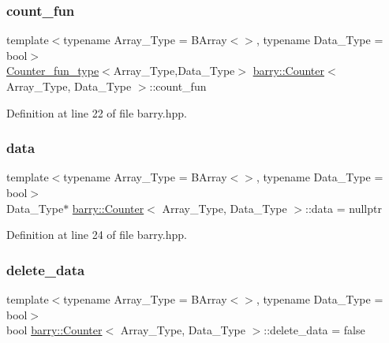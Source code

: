 \subsubsection{\texorpdfstring{count\+\_\+fun}{count\_fun}}
{\footnotesize\ttfamily template$<$typename Array\+\_\+\+Type  = B\+Array$<$$>$, typename Data\+\_\+\+Type  = bool$>$ \\
\hyperlink{namespacebarry_abaaae3200da8e4b7faac3c04fe9c3081}{Counter\+\_\+fun\+\_\+type}$<$Array\+\_\+\+Type,Data\+\_\+\+Type$>$ \hyperlink{classbarry_1_1_counter}{barry\+::\+Counter}$<$ Array\+\_\+\+Type, Data\+\_\+\+Type $>$\+::count\+\_\+fun}



Definition at line 22 of file barry.\+hpp.

\mbox{\label{classbarry_1_1_counter_af8196eeaaa4b58b788969c07aee7f1ee}} 
\subsubsection{\texorpdfstring{data}{data}}
{\footnotesize\ttfamily template$<$typename Array\+\_\+\+Type  = B\+Array$<$$>$, typename Data\+\_\+\+Type  = bool$>$ \\
Data\+\_\+\+Type$\ast$ \hyperlink{classbarry_1_1_counter}{barry\+::\+Counter}$<$ Array\+\_\+\+Type, Data\+\_\+\+Type $>$\+::data = nullptr}



Definition at line 24 of file barry.\+hpp.

\mbox{\label{classbarry_1_1_counter_a5445fa47abeff4b5675a5e5c12e4917a}} 
\subsubsection{\texorpdfstring{delete\+\_\+data}{delete\_data}}
{\footnotesize\ttfamily template$<$typename Array\+\_\+\+Type  = B\+Array$<$$>$, typename Data\+\_\+\+Type  = bool$>$ \\
bool \hyperlink{classbarry_1_1_counter}{barry\+::\+Counter}$<$ Array\+\_\+\+Type, Data\+\_\+\+Type $>$\+::delete\+\_\+data = false}



